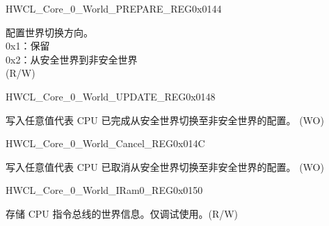 \begin{register}{H}{WCL\_Core\_0\_World\_PREPARE\_REG}{0x0144}\label{regdesc:WCLCORE0WORLDPREPAREREG}
%
%
\regnewline%
\begin{regdesc}\begin{reglist}
\label{fielddesc:WCLCORE0WORLDPREPARE}\item [WCL\_CORE\_0\_WORLD\_PREPARE] 配置世界切换方向。\\
0x1：保留\\
0x2：从安全世界到非安全世界\\
(R/W)
\end{reglist}\end{regdesc}
\end{register}


\begin{register}{H}{WCL\_Core\_0\_World\_UPDATE\_REG}{0x0148}\label{regdesc:WCLCORE0WORLDUPDATEREG}
%
\regnewline%
\begin{regdesc}\begin{reglist}
\label{fielddesc:WCLCORE0UPDATE}\item [WCL\_CORE\_0\_UPDATE] 写入任意值代表 CPU 已完成从安全世界切换至非安全世界的配置。 (WO)
\end{reglist}\end{regdesc}
\end{register}


\begin{register}{H}{WCL\_Core\_0\_World\_Cancel\_REG}{0x014C}\label{regdesc:WCLCORE0WORLDCANCELREG}
%
\regnewline%
\begin{regdesc}\begin{reglist}
\label{fielddesc:WCLCORE0WORLDCANCEL}\item [WCL\_CORE\_0\_WORLD\_CANCEL]  写入任意值代表 CPU 已取消从安全世界切换至非安全世界的配置。  (WO)
\end{reglist}\end{regdesc}
\end{register}


\begin{register}{H}{WCL\_Core\_0\_World\_IRam0\_REG}{0x0150}\label{regdesc:WCLCORE0WORLDIRAM0REG}
%
%
\regnewline%
\begin{regdesc}\begin{reglist}
\label{fielddesc:WCLCORE0WORLDIRAM0}\item [WCL\_CORE\_0\_WORLD\_IRAM0] 存储 CPU 指令总线的世界信息。仅调试使用。(R/W)
\end{reglist}\end{regdesc}
\end{register}


